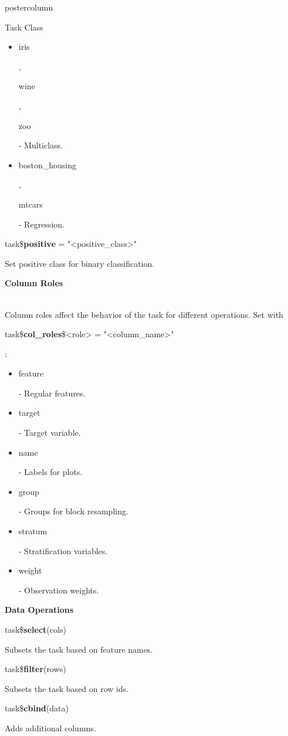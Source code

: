 \documentclass{beamer}
\newcommand{\codeinline}[1]{\begin{codeboxinline}#1\end{codeboxinline}}
\newcommand{\sectionheading}[1]{{\color{mlrblue}\large\raggedright\textbf{#1}}\vspace{1em}}
\begin{document}
\begin{frame}[fragile]{}
\begin{columns}
\begin{column}{.245\textwidth}
\begin{beamercolorbox}[center]{postercolumn}
\begin{minipage}{.98\textwidth}
{\begin{myblock}{Task Class}
\begin{itemize}
								\codeinline{spam} - Twoclass.
								\item \codeinline{iris}, \codeinline{wine}, \codeinline{zoo} - Multiclass.
								\item \codeinline{boston\_housing}, \codeinline{mtcars} - Regression.
                            \end{itemize}
							\vspace{1em}
							\begin{codebox}
								task\$\textbf{positive} = "<positive\_class>"
							\end{codebox}
							Set positive class for binary classification.
							\vspace{1em}
							\\
                            \sectionheading{Column Roles}
                            \\
							Column roles affect the behavior of the task for different operations. 
							Set with \codeinline{task\$\textbf{col\_roles}\$<role> = "<column\_name>"}:
							\begin{itemize}
								\item \codeinline{feature} - Regular features.
								\item \codeinline{target} - Target variable.
								\item \codeinline{name} - Labels for plots.
								\item \codeinline{group} -  Groups for block resampling.
								\item \codeinline{stratum} - Stratification variables.
								\item \codeinline{weight} - Observation weights.
							\end{itemize}
							\vspace{1em}
                            \sectionheading{Data Operations}
                            \begin{codebox}
								task\$\textbf{select}(cols)
							\end{codebox}
							Subsets the task based on feature names.
							\\
							\begin{codebox}
								task\$\textbf{filter}(rows)
							\end{codebox}
							Subsets the task based on row ids.
							\\
							\begin{codebox}
								task\$\textbf{cbind}(data)
							\end{codebox}
							Adds additional columns.

\end{myblock}}
\end{minipage}
\end{beamercolorbox}
\end{column}
\end{columns}
\end{frame}
\end{document}
